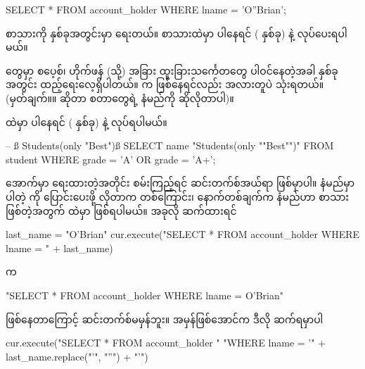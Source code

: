 %
\begin{sql}
SELECT * FROM account_holder WHERE lname = 'O''Brian';
\end{sql}
%
စာသားကို  နှစ်ခုအတွင်းမှာ ရေးတယ်။ စာသားထဲမှာ  ပါနေရင်  ( နှစ်ခု) နဲ့  လုပ်ပေးရပါမယ်။ 

 တွေမှာ စပေ့စ်၊ ဟိုက်ဖန် (သို့) အခြား ထူးခြားသင်္ကေတတွေ ပါဝင်နေတဲ့အခါ    နှစ်ခုအတွင်း ထည့်ရေးလေ့ရှိပါတယ်။  က  ဖြစ်နေရင်လည်း အလားတူပဲ  သုံးရတယ်။ (မှတ်ချက်။\qquad ။  ဆိုတာ  စတာတွေရဲ့ နံမည်ကို ဆိုလိုတာပါ)။

%
%
 ထဲမှာ  ပါနေရင်  ( နှစ်ခု) နဲ့  လုပ်ရပါမယ်။
%
\begin{sql}
-- ß Students(only "Best")ß
SELECT name "Students(only ""Best"")" FROM student 
WHERE grade = 'A' OR grade = 'A+';
\end{sql}
%

အောက်မှာ ရေးထားတဲ့အတိုင်း စမ်းကြည့်ရင်  ဆင်းတက်စ်အယ်ရာ ဖြစ်မှာပါ။ နံမည်မှာပါတဲ့  ကို  ပြောင်းပေးဖို့ လိုတာက တစ်ကြောင်း၊ နောက်တစ်ချက်က နံမည်ဟာ စာသားဖြစ်တဲ့အတွက်  ထဲမှာ  ဖြစ်ရပါမယ်။ အခုလို ဆက်ထားရင်
%
\begin{py}
last_name = "O'Brian"
cur.execute("SELECT * FROM account_holder WHERE lname = " + last_name)
\end{py}
%
 က 
%
\begin{py}
"SELECT * FROM account_holder WHERE lname = O'Brian"
\end{py}
%
ဖြစ်နေတာကြောင့် ဆင်းတက်စ်မမှန်ဘူး။ အမှန်ဖြစ်အောင်က ဒီလို ဆက်ရမှာပါ

%
\begin{py}
cur.execute("SELECT * FROM account_holder "
            "WHERE lname = '" + last_name.replace("'", "''") + "'")
\end{py}
%

